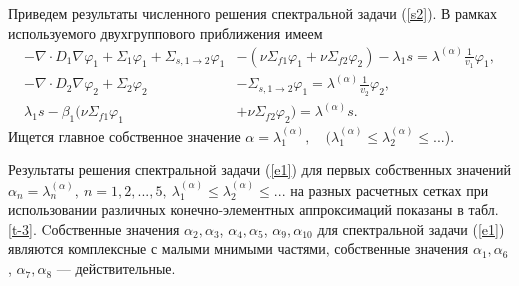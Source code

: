 Приведем результаты численного решения спектральной задачи (\ref{s2}).
В рамках используемого двухгруппового приближения имеем 
\begin{equation}\label{e1}
\begin{split}
 - \nabla \cdot D_1 \nabla \varphi_1  + \Sigma_1 \varphi_1 + \Sigma_{s,1\rightarrow 2} \varphi_1  
& - (\nu \Sigma_{f1} \varphi_1 + \nu \Sigma_{f2} \varphi_2) - \lambda_1 s = \lambda^{(\alpha)} \frac{1}{v_1}   \varphi_1, \\
 - \nabla \cdot D_2 \nabla \varphi_2  + \Sigma_2 \varphi_2 & - \Sigma_{s,1\rightarrow 2} \varphi_1  
 = \lambda^{(\alpha)} \frac{1}{v_2}   \varphi_2,\\
\lambda_1 s - \beta_1(\nu \Sigma_{f1} \varphi_1 &+ \nu \Sigma_{f2} \varphi_2) = \lambda^{(\alpha)} s. 
\end{split}
\end{equation} 
Ищется главное собственное значение $\alpha = \lambda_1^{(\alpha)}, \quad (\lambda_1^{(\alpha)} \leq  \lambda_2^{(\alpha )} \leq ...$).


Результаты решения спектральной задачи (\ref{e1}) для первых собственных
значений $\alpha_n = \lambda_n^{(\alpha)}, \ n = 1,2, ..., 5, \  \lambda_1^{(\alpha)} \leq  \lambda_2^{(\alpha )} \leq ...$
на разных расчетных сетках при использовании различных
конечно-элементных аппроксимаций показаны в табл.\ref{t-3}. 
Cобственные значения $\alpha_2, \alpha_3$, $\alpha_4, \alpha_5$, $\alpha_9, \alpha_{10}$ 
для спектральной задачи (\ref{e1}) являются комплексные с малыми мнимыми частями, собственные значения $\alpha_1, \alpha_6$, $\alpha_7, \alpha_8$ --- действительные.

